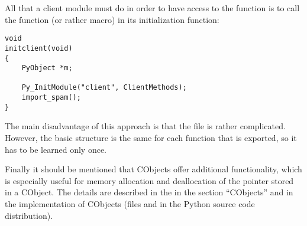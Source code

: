 All that a client module must do in order to have access to the
function  is to call the function (or
rather macro)  in its initialization
function:

\begin{verbatim}
void
initclient(void)
{
    PyObject *m;

    Py_InitModule("client", ClientMethods);
    import_spam();
}
\end{verbatim}

The main disadvantage of this approach is that the file
 is rather complicated. However, the
basic structure is the same for each function that is
exported, so it has to be learned only once.

Finally it should be mentioned that CObjects offer additional
functionality, which is especially useful for memory allocation and
deallocation of the pointer stored in a CObject. The details
are described in the  in the section ``CObjects'' and in the
implementation of CObjects (files  and
 in the Python source code distribution).
